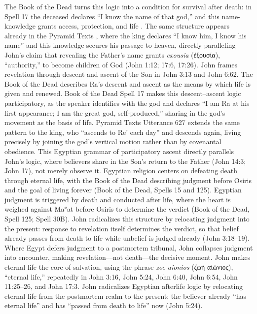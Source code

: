 The Book of the Dead turns this logic into a condition for survival after death: in Spell 17 the deceased declares ``I know the name of that god,'' and this name-knowledge grants access, protection, and life \cite[Spell 17]{bookofthedead}.
The same structure appears already in the Pyramid Texts \cite[Utterance 301]{pyramidtexts}, where the king declares ``I know him, I know his name'' and this knowledge secures his passage to heaven, directly paralleling John's claim that revealing the Father's name grants \emph{exousia} (ἐξουσία), ``authority,'' to become children of God (John 1:12; 17:6, 17:26).
John frames revelation through descent and ascent of the Son in John 3:13 and John 6:62.
The Book of the Dead \cite[Chapter 15]{bookofthedead} describes Ra's descent and ascent as the means by which life is given and renewed.
Book of the Dead Spell 17 makes this descent--ascent logic participatory, as the speaker identifies with the god and declares ``I am Ra at his first appearance; I am the great god, self-produced,'' sharing in the god's movement as the basis of life.
Pyramid Texts Utterance 627 \cite[Utterance 627]{pyramidtexts} extends the same pattern to the king, who ``ascends to Re' each day'' and descends again, living precisely by joining the god's vertical motion rather than by covenantal obedience.
This Egyptian grammar of participatory ascent directly parallels John's logic, where believers share in the Son's return to the Father (John 14:3; John 17), not merely observe it.
Egyptian religion centers on defeating death through eternal life, with the Book of the Dead describing judgment before Osiris and the goal of living forever (Book of the Dead, Spells 15 and 125).
Egyptian judgment is triggered by death and conducted after life, where the heart is weighed against Maʿat before Osiris to determine the verdict (Book of the Dead, Spell 125; Spell 30B).
John radicalizes this structure by relocating judgment into the present: response to revelation itself determines the verdict, so that belief already passes from death to life while unbelief is judged already (John 3:18--19).
Where Egypt defers judgment to a postmortem tribunal, John collapses judgment into encounter, making revelation---not death---the decisive moment.
John makes eternal life the core of salvation, using the phrase \emph{zoe aionios} (ζωὴ αἰώνιος), ``eternal life,'' repeatedly in John 3:16, John 5:24, John 6:40, John 6:54, John 11:25--26, and John 17:3.
John radicalizes Egyptian afterlife logic by relocating eternal life from the postmortem realm to the present: the believer already ``has eternal life'' and has ``passed from death to life'' now (John 5:24).
